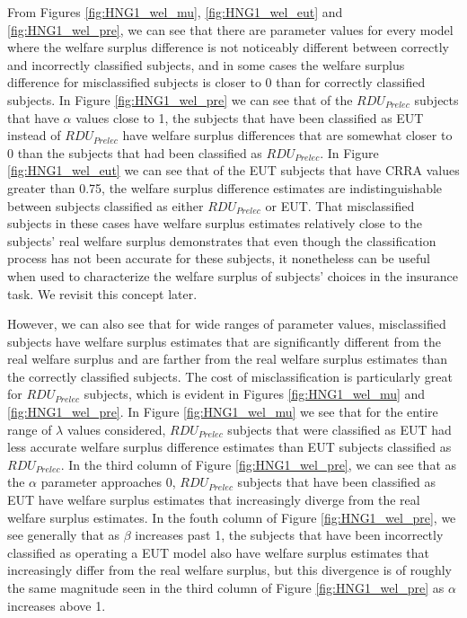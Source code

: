 \documentclass[../main.tex]{subfiles}
\begin{document}
From Figures \ref{fig:HNG1_wel_mu}, \ref{fig:HNG1_wel_eut} and \ref{fig:HNG1_wel_pre}, we can see that there are parameter values for every model where the welfare surplus difference is not noticeably different between correctly and incorrectly classified subjects, and in some cases the welfare surplus difference for misclassified subjects is closer to 0 than for correctly classified subjects.
In Figure \ref{fig:HNG1_wel_pre} we can see that of the $\mathit{RDU_{Prelec}}$ subjects that have $\alpha$ values close to 1, the subjects that have been classified as EUT instead of $\mathit{RDU_{Prelec}}$ have welfare surplus differences that are somewhat closer to 0 than the subjects that had been classified as $\mathit{RDU_{Prelec}}$.
In Figure \ref{fig:HNG1_wel_eut} we can see that of the EUT subjects that have CRRA values greater than 0.75, the welfare surplus difference estimates are indistinguishable between subjects classified as either $\mathit{RDU_{Prelec}}$ or EUT.
That misclassified subjects in these cases have welfare surplus estimates relatively close to the subjects' real welfare surplus demonstrates that even though the classification process has not been accurate for these subjects, it nonetheless can be useful when used to characterize the welfare surplus of subjects' choices in the insurance task.
We revisit this concept later.

However, we can also see that for wide ranges of parameter values, misclassified subjects have welfare surplus estimates that are significantly different from the real welfare surplus and are farther from the real welfare surplus estimates than the correctly classified subjects.
The cost of misclassification is particularly great for $\mathit{RDU_{Prelec}}$ subjects, which is evident in Figures \ref{fig:HNG1_wel_mu} and \ref{fig:HNG1_wel_pre}.
In Figure \ref{fig:HNG1_wel_mu} we see that for the entire range of $\lambda$ values considered, $\mathit{RDU_{Prelec}}$ subjects that were classified as EUT had less accurate welfare surplus difference estimates than EUT subjects classified as $\mathit{RDU_{Prelec}}$.
In the third column of Figure \ref{fig:HNG1_wel_pre}, we can see that as the $\alpha$ parameter approaches 0, $\mathit{RDU_{Prelec}}$ subjects that have been classified as EUT have welfare surplus estimates that increasingly diverge from the real welfare surplus estimates.
In the fouth column of Figure \ref{fig:HNG1_wel_pre}, we see generally that as $\beta$ increases past 1, the subjects that have been incorrectly classified as operating a EUT model also have welfare surplus estimates that increasingly differ from the real welfare surplus, but this divergence is of roughly the same magnitude seen in the third column of Figure \ref{fig:HNG1_wel_pre} as $\alpha$ increases above 1.
\end{document}
